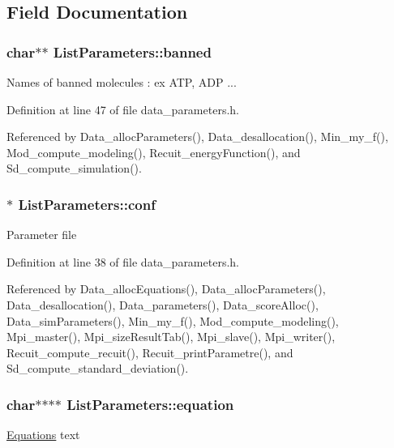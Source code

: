 \subsection{Field Documentation}
\hypertarget{structListParameters_ab0d2940b00e8d0d8ae31606f79ce6373}{
\subsubsection[{banned}]{\setlength{\rightskip}{0pt plus 5cm}char$\ast$$\ast$ {\bf ListParameters::banned}}}
\label{structListParameters_ab0d2940b00e8d0d8ae31606f79ce6373}
Names of banned molecules : ex ATP, ADP ... 

Definition at line 47 of file data\_\-parameters.h.



Referenced by Data\_\-allocParameters(), Data\_\-desallocation(), Min\_\-my\_\-f(), Mod\_\-compute\_\-modeling(), Recuit\_\-energyFunction(), and Sd\_\-compute\_\-simulation().

\hypertarget{structListParameters_a96adc4ee0346b24efd2139d3768be76e}{
\subsubsection[{conf}]{$\ast$ {\bf ListParameters::conf}}}
\label{structListParameters_a96adc4ee0346b24efd2139d3768be76e}
Parameter file 

Definition at line 38 of file data\_\-parameters.h.



Referenced by Data\_\-allocEquations(), Data\_\-allocParameters(), Data\_\-desallocation(), Data\_\-parameters(), Data\_\-scoreAlloc(), Data\_\-simParameters(), Min\_\-my\_\-f(), Mod\_\-compute\_\-modeling(), Mpi\_\-master(), Mpi\_\-sizeResultTab(), Mpi\_\-slave(), Mpi\_\-writer(), Recuit\_\-compute\_\-recuit(), Recuit\_\-printParametre(), and Sd\_\-compute\_\-standard\_\-deviation().

\hypertarget{structListParameters_a1d99e34efe708f0a4dee5f5de7a50c6c}{
\subsubsection[{equation}]{\setlength{\rightskip}{0pt plus 5cm}char$\ast$$\ast$$\ast$$\ast$ {\bf ListParameters::equation}}}
\label{structListParameters_a1d99e34efe708f0a4dee5f5de7a50c6c}
\hyperlink{structEquations}{Equations} text 

